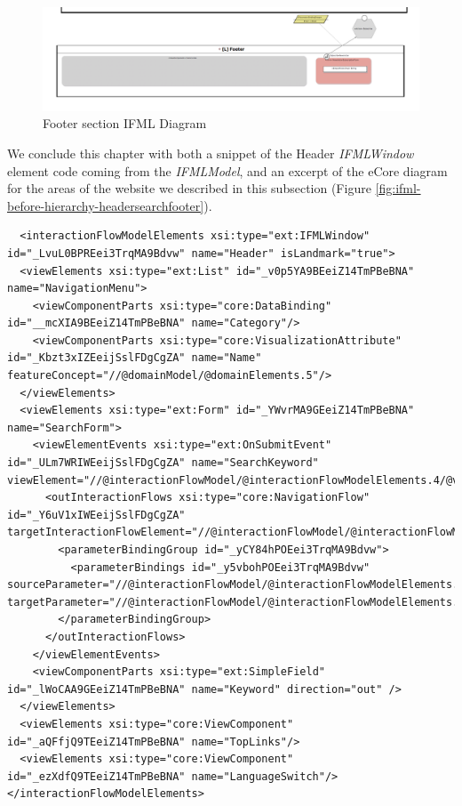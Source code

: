 \vspace{0.5cm}
\begin{figure}[H]
  \centering
    \includegraphics[width=12cm]{images/diagrams/before/ifml-footer.png}
  \caption{Footer section IFML Diagram}
  \label{fig:ifml-before-footer}
\end{figure}
\vspace{0.5cm}

\newpage
We conclude this chapter with both a snippet of the Header \textit{IFMLWindow} element code coming from the \textit{IFMLModel}, and an excerpt of the eCore diagram for the areas of the website we described in this subsection (Figure \ref{fig:ifml-before-hierarchy-headersearchfooter}).

\vspace{0.5cm}
\lstset{language=XML}
\begin{lstlisting} 
  <interactionFlowModelElements xsi:type="ext:IFMLWindow" id="_LvuL0BPREei3TrqMA9Bdvw" name="Header" isLandmark="true">
  <viewElements xsi:type="ext:List" id="_v0p5YA9BEeiZ14TmPBeBNA" name="NavigationMenu">
    <viewComponentParts xsi:type="core:DataBinding" id="__mcXIA9BEeiZ14TmPBeBNA" name="Category"/>
    <viewComponentParts xsi:type="core:VisualizationAttribute" id="_Kbzt3xIZEeijSslFDgCgZA" name="Name" featureConcept="//@domainModel/@domainElements.5"/>
  </viewElements>
  <viewElements xsi:type="ext:Form" id="_YWvrMA9GEeiZ14TmPBeBNA" name="SearchForm">
    <viewElementEvents xsi:type="ext:OnSubmitEvent" id="_ULm7WRIWEeijSslFDgCgZA" name="SearchKeyword" viewElement="//@interactionFlowModel/@interactionFlowModelElements.4/@viewElements.1">
      <outInteractionFlows xsi:type="core:NavigationFlow" id="_Y6uV1xIWEeijSslFDgCgZA" targetInteractionFlowElement="//@interactionFlowModel/@interactionFlowModelElements.3">
        <parameterBindingGroup id="_yCY84hPOEei3TrqMA9Bdvw">
          <parameterBindings id="_y5vbohPOEei3TrqMA9Bdvw" sourceParameter="//@interactionFlowModel/@interactionFlowModelElements.4/@viewElements.1/@viewComponentParts.0" targetParameter="//@interactionFlowModel/@interactionFlowModelElements.3/@parameters.0"/>
        </parameterBindingGroup>
      </outInteractionFlows>
    </viewElementEvents>
    <viewComponentParts xsi:type="ext:SimpleField" id="_lWoCAA9GEeiZ14TmPBeBNA" name="Keyword" direction="out" />
  </viewElements>
  <viewElements xsi:type="core:ViewComponent" id="_aQFfjQ9TEeiZ14TmPBeBNA" name="TopLinks"/>
  <viewElements xsi:type="core:ViewComponent" id="_ezXdfQ9TEeiZ14TmPBeBNA" name="LanguageSwitch"/>
</interactionFlowModelElements>
\end{lstlisting}
\vspace{0.5cm}


